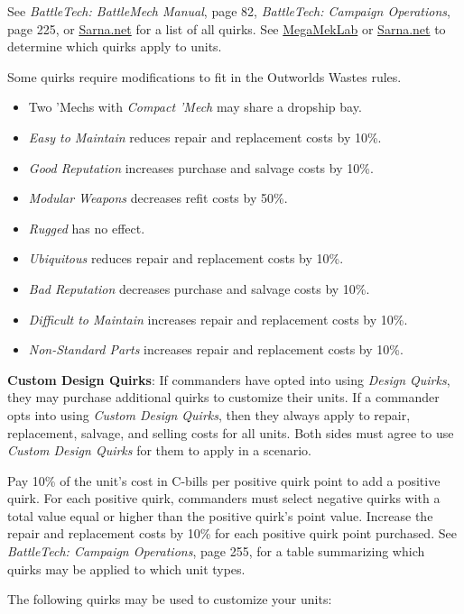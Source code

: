 See \emph{BattleTech: BattleMech Manual}, page 82, \emph{BattleTech: Campaign Operations}, page 225, or \href{https://sarna.net}{Sarna.net} for a list of all quirks.
See \href{https://megamek.org}{MegaMekLab} or \href{https://sarna.net}{Sarna.net} to determine which quirks apply to units.

Some quirks require modifications to fit in the Outworlds Wastes rules.

\begin{itemize}

\item Two 'Mechs with \emph{Compact 'Mech} may share a dropship bay.

\item \emph{Easy to Maintain} reduces repair and replacement costs by 10\%.

\item \emph{Good Reputation} increases purchase and salvage costs by 10\%.

\item \emph{Modular Weapons} decreases refit costs by 50\%.

\item \emph{Rugged} has no effect.

\item \emph{Ubiquitous} reduces repair and replacement costs by 10\%.

\item \emph{Bad Reputation} decreases purchase and salvage costs by 10\%.

\item \emph{Difficult to Maintain} increases repair and replacement costs by 10\%.

\item \emph{Non-Standard Parts} increases repair and replacement costs by 10\%.

\end{itemize}

\item {\bfseries Custom Design Quirks}: If commanders have opted into using \emph{Design Quirks}, they may purchase additional quirks to customize their units.
If a commander opts into using \emph{Custom Design Quirks}, then they always apply to repair, replacement, salvage, and selling costs for all units.
Both sides must agree to use \emph{Custom Design Quirks} for them to apply in a scenario.

Pay 10\% of the unit's cost in C-bills per positive quirk point to add a positive quirk.
For each positive quirk, commanders must select negative quirks with a total value equal or higher than the positive quirk's point value.
Increase the repair and replacement costs by 10\% for each positive quirk point purchased.
See \emph{BattleTech: Campaign Operations}, page 255, for a table summarizing which quirks may be applied to which unit types.

The following quirks may be used to customize your units:
